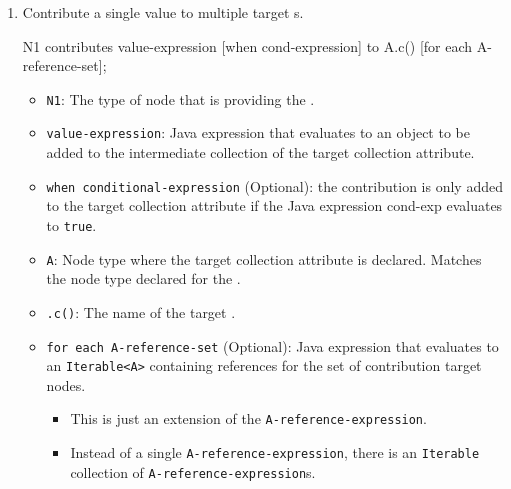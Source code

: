 \begin{definition}[Contribution]
\begin{enumerate}[noitemsep]
  \item Contribute a single value to multiple target s.
\begin{javasource}
  N1 contributes value-expression
    [when cond-expression]
    to A.c()
    [for each A-reference-set];
\end{javasource}
    \begin{itemize}[noitemsep]
    \item \texttt{N1}: The type of  node that is providing the .
    \item \texttt{value-expression}: Java expression that evaluates to an object to be added to the intermediate collection of the target collection attribute.
    \item \texttt{when conditional-expression} (Optional): the contribution is only added to the target collection attribute if the Java expression cond-exp evaluates to \texttt{true}.
    \item \texttt{A}: Node type where the target collection attribute is declared. Matches the node type declared for the .
    \item \texttt{.c()}: The name of the target .
    \item \texttt{for each A-reference-set} (Optional): Java expression that evaluates to an \texttt{Iterable<A>} containing references for the set of contribution target nodes.
      \begin{itemize}[noitemsep]
      \item This is just an extension of the \texttt{A-reference-expression}.
      \item Instead of a single \texttt{A-reference-expression}, there is an \texttt{Iterable} collection of \texttt{A-reference-expression}s.
      \end{itemize}
    \end{itemize}


\end{enumerate}
\end{definition}

